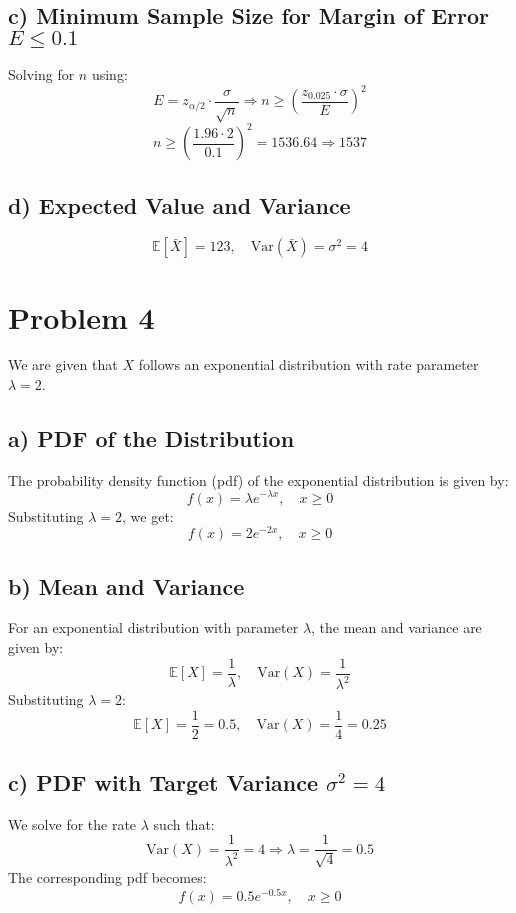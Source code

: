 \documentclass[12pt]{article}
\begin{document}
\subsection*{c) Minimum Sample Size for Margin of Error $E \leq 0.1$}

Solving for $n$ using:
\[
E = z_{\alpha/2} \cdot \frac{\sigma}{\sqrt{n}} \Rightarrow n \geq \left(\frac{z_{0.025} \cdot \sigma}{E}\right)^2
\]
\[
n \geq \left(\frac{1.96 \cdot 2}{0.1}\right)^2 = 1536.64 \Rightarrow \boxed{1537}
\]

\subsection*{d) Expected Value and Variance}

\[
\mathbb{E}[\bar{X}] = 123, \quad \text{Var}(\bar{X}) = \sigma^2 = 4
\]


\section*{Problem 4}

We are given that $X$ follows an exponential distribution with rate parameter $\lambda = 2$.

\subsection*{a) PDF of the Distribution}

The probability density function (pdf) of the exponential distribution is given by:
\[
f(x) = \lambda e^{-\lambda x}, \quad x \geq 0
\]
Substituting $\lambda = 2$, we get:
\[
f(x) = 2 e^{-2x}, \quad x \geq 0
\]

\subsection*{b) Mean and Variance}

For an exponential distribution with parameter $\lambda$, the mean and variance are given by:
\[
\mathbb{E}[X] = \frac{1}{\lambda}, \quad \text{Var}(X) = \frac{1}{\lambda^2}
\]
Substituting $\lambda = 2$:
\[
\mathbb{E}[X] = \frac{1}{2} = 0.5, \quad \text{Var}(X) = \frac{1}{4} = 0.25
\]

\subsection*{c) PDF with Target Variance $\sigma^2 = 4$}

We solve for the rate $\lambda$ such that:
\[
\text{Var}(X) = \frac{1}{\lambda^2} = 4 \Rightarrow \lambda = \frac{1}{\sqrt{4}} = 0.5
\]
The corresponding pdf becomes:
\[
f(x) = 0.5 e^{-0.5x}, \quad x \geq 0
\]
\end{document}

